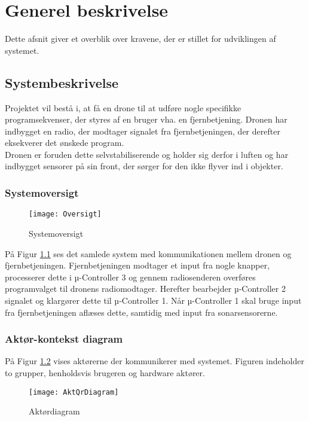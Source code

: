 \documentclass[Main]{subfiles}
\begin{document}
\chapter{Generel beskrivelse}
Dette afsnit giver et overblik over kravene, der er stillet for udviklingen af systemet.

\section{Systembeskrivelse}
Projektet vil bestå i, at få en drone til at udføre nogle specifikke programsekvenser, der styres af en bruger vha. en fjernbetjening.
Dronen har indbygget en radio, der modtager signalet fra fjernbetjeningen, der derefter eksekverer det ønskede program.
\\
Dronen er foruden dette selvstabiliserende og holder sig derfor i luften og har indbygget sensorer på sin front, der sørger for den ikke flyver ind i objekter.


\subsection{Systemoversigt}

\begin{figure}[hbtp]
\centering
\texttt{[image: Oversigt]}
\caption{Systemoversigt}
\label{Fig:Oversigt}
\end{figure}

På Figur \ref{Fig:Oversigt} ses det samlede system med kommunikationen mellem dronen og fjernbetjeningen.
Fjernbetjeningen modtager et input fra nogle knapper, processerer dette i µ-Controller 3 og gennem radiosenderen overføres programvalget til dronens radiomodtager.
Herefter bearbejder µ-Controller 2 signalet og klargører dette til µ-Controller 1.
Når µ-Controller 1 skal bruge input fra fjernbetjeningen aflæses dette, samtidig med input fra sonarsensorerne.



\subsection{Aktør-kontekst diagram}

På Figur \ref{Fig:Aktor-oversigt} vises aktørerne der kommunikerer med systemet.
Figuren indeholder to grupper, henholdsvis brugeren og hardware aktører.


\begin{figure}[hbtp]
\centering
\texttt{[image: AktQrDiagram]}
\caption{Aktørdiagram}
\label{Fig:Aktor-oversigt}
\end{figure}
\end{document}
